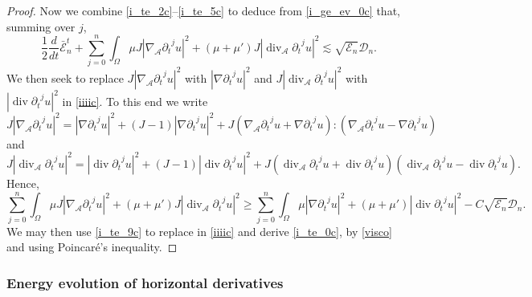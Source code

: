 \documentclass[a4paper,reqno,11pt]{amsart}
\numberwithin{equation}{section}
\providecommand{\abs}[1]{\left\vert#1\right\vert}
\providecommand{\sd}[1]{\mathcal{D}_{#1}}
\providecommand{\se}[1]{\mathcal{E}_{#1}}
\begin{document}
\begin{proof}
Now we combine \eqref{i_te_2c}--\eqref{i_te_5c} to deduce from \eqref{i_ge_ev_0c} that, summing over $j$,
\begin{equation} \label{iiiic}
 {\frac{1}{2}} \frac{d}{dt}\bar{\mathcal{E}}_{n}^{t}
+  \sum_{j=0}^{ n}  \int_\Omega  \mu J\abs{ {{\nabla}_{\mathcal{A}}}{\partial_t}^j u}^2 +(\mu+\mu') J\abs{ {\operatorname{div}_{\mathcal{A}}}{\partial_t}^j u}^2
  {\lesssim}   \sqrt{\se{n} } \sd{ n}.
\end{equation}
We then seek to replace $ J\abs{ \nabla_{\mathcal{A}} {\partial_t}^{j} u}^2$ with $\abs{\nabla {\partial_t}^{j} u}^2$ and $ J\abs{ \operatorname{div}_{\mathcal{A}} {\partial_t}^{j} u}^2$ with $\abs{\operatorname{div} {\partial_t}^{j} u}^2$
in \eqref{iiiic}.  To this end we write
\begin{equation}\label{i_te_8c}
 J\abs{ {{\nabla}_{\mathcal{A}}} {\partial_t}^{j} u}^2 = \abs{\nabla {\partial_t}^{j} u}^2+(J-1)\abs{\nabla {\partial_t}^{j} u}^2  +   J\left({{\nabla}_{\mathcal{A}}} {\partial_t}^{j} u + \nabla{\partial_t}^{j} u\right): \left({{\nabla}_{\mathcal{A}}} {\partial_t}^{j} u - \nabla {\partial_t}^{j} u\right)
\end{equation}
and
\begin{equation}\label{i_te_8c2}
 J\abs{ \operatorname{div}_{\mathcal{A}} {\partial_t}^{j} u}^2 = \abs{\operatorname{div} {\partial_t}^{j} u}^2+(J-1)\abs{\operatorname{div} {\partial_t}^{j} u}^2  +   J\left({\operatorname{div}_{\mathcal{A}}} {\partial_t}^{j} u + \operatorname{div}{\partial_t}^{j} u\right) \left({\operatorname{div}_{\mathcal{A}}} {\partial_t}^{j} u - \operatorname{div} {\partial_t}^{j} u\right).
\end{equation}
Hence,
\begin{equation}\label{i_te_9c}
 \sum_{j=0}^{ n}  \int_\Omega  \mu J\abs{ {{\nabla}_{\mathcal{A}}}{\partial_t}^j u}^2 +(\mu+\mu') J\abs{ {\operatorname{div}_{\mathcal{A}}}{\partial_t}^j u}^2
 \ge \sum_{j=0}^{ n}  \int_\Omega  \mu  \abs{ \nabla{\partial_t}^j u}^2 +(\mu+\mu') \abs{ \operatorname{div}{\partial_t}^j u}^2
 -C  \sqrt{\se{n}} \sd{n}.
\end{equation}
We may then use \eqref{i_te_9c} to replace in \eqref{iiiic} and derive \eqref{i_te_0c}, by \eqref{visco} and using Poincar\'e's inequality.
\end{proof}

\subsubsection{Energy evolution of horizontal derivatives}
\end{document}
